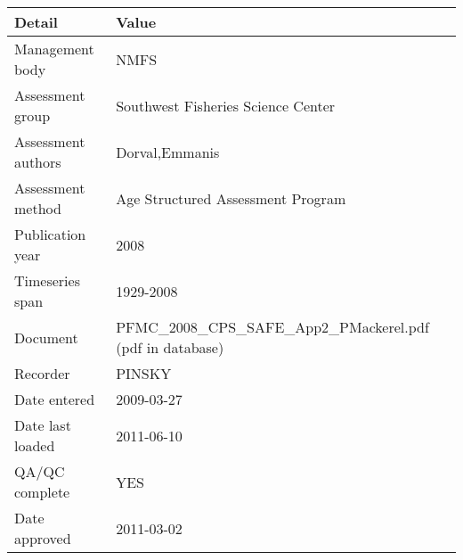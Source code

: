 \begin{table}[htb]
\centering
\begin{tabular}{lp{7cm}}
\toprule
Detail & Value \\
\midrule
Management body    & NMFS                                                         \\
Assessment group   & Southwest Fisheries Science Center                           \\
Assessment authors & Dorval,Emmanis                                               \\
Assessment method  & Age Structured Assessment Program                            \\
Publication year   & 2008                                                         \\
Timeseries span    & 1929-2008                                                    \\
Document           & PFMC\_2008\_CPS\_SAFE\_App2\_PMackerel.pdf (pdf in database) \\
Recorder           & PINSKY                                                       \\
Date entered       & 2009-03-27                                                   \\
Date last loaded   & 2011-06-10                                                   \\
QA/QC complete     & YES                                                          \\
Date approved      & 2011-03-02                                                   \\
\bottomrule
\end{tabular}
\label{tab:assessdet}
\end{table}
